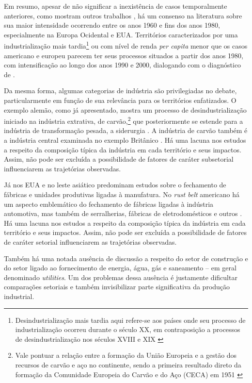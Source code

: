 Em resumo, apesar de não significar a inexistência de casos
temporalmente anteriores, como mostram outros trabalhos
\citep{clingingsmith_deindustrialization_2008,pamuk_ottoman_2011}, há um consenso na
literatura sobre sua maior intensidade ocorrendo entre os anos 1960 e
fins dos anos 1980, especialmente na Europa Ocidental e EUA. Territórios
caracterizados por uma industrialização mais tardia\footnote{Desindustrialização
  mais tardia aqui refere-se aos países onde seu processo de
  industrialização ocorreu durante o século XX, em contraposição a
  processos de desindustrialização nos séculos XVIII e XIX
  \citep{mello1982}}
ou com nível de renda \emph{per capita} menor que os casos americano
e europeu parecem ter seus processos situados a partir dos anos 1980,
com intensificação ao longo dos anos 1990 e 2000, dialogando com o
diagnóstico de \citet{rodrik_premature_2016}.

Da mesma forma, algumas categorias de indústria são privilegiadas no
debate, particularmente em função de sua relevância para os territórios
enfatizados. O exemplo alemão, como já apresentado, mostra um processo
de desindustrialização iniciado na indústria extrativa, de
carvão,\footnote{Vale pontuar a relação entre a formação da União
  Europeia e a gestão dos recursos de carvão e aço no continente, sendo
  a primeira resultado direto da formação da Comunidade Europeia do
  Carvão e do Aço (CECA) em 1951
  \citep{valls_european_2016}} que
posteriormente se estende para a indústria de transformação pesada, a
siderurgia \citep{berger_burdens_2017}. A indústria de carvão também é a indústria
central examinada no exemplo Britânico
\citep{tomlinson_-industrialization_2016}. Há
uma lacuna nos estudos a respeito da composição típica da indústria em
cada território e seus impactos. Assim, não pode ser excluída a
possibilidade de fatores de caráter subsetorial influenciarem as
trajetórias observadas.

Já nos EUA e no leste asiático predominam estudos sobre o fechamento de
fábricas e unidades produtivas ligadas à manufatura. No \emph{rust belt}
americano há um aspecto emblemático do fechamento de fábricas ligadas à
indústria automotiva, mas também de serralherias, fábricas de
eletrodomésticos e outros
\citep{cowie_beyond_2003,high_industrial_2003}. Há uma lacuna nos estudos a respeito da composição
típica da indústria em cada território e seus impactos. Assim, não pode
ser excluída a possibilidade de fatores de caráter setorial
influenciarem as trajetórias observadas.

Também há uma notada ausência de discussão a respeito do setor de
construção e do setor ligado ao fornecimento de energia, água, gás e
saneamento -- em geral denominado \emph{utilities}. Um dos problemas
dessa ausência é justamente dificultar comparações setoriais e também
invisibilizar parte significativa da produção industrial.

